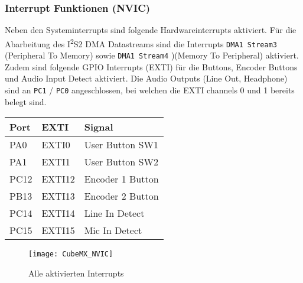 \subsubsection{Interrupt Funktionen (NVIC)}
\label{sec:CubeMXNVIC}

Neben den Systeminterrupts sind folgende Hardwareinterrupts aktiviert.
Für die Abarbeitung des I\textsuperscript{2}S2 DMA Datastreams sind die Interrupts \texttt{DMA1 Stream3} (Peripheral To Memory) sowie \texttt{DMA1 Stream4} )(Memory To Peripheral) aktiviert.
Zudem sind folgende GPIO Interrupts (EXTI) für die Buttons, Encoder Buttons und Audio Input Detect aktiviert. Die Audio Outputs (Line Out, Headphone) sind an \texttt{PC1} / \texttt{PC0} angeschlossen, bei welchen die EXTI channels 0 und 1 bereits belegt sind.

\begin{table}[H]
	\centering
	\begin{tabular}{|l|l|l|}
		\hline
		\textbf{Port} & \textbf{EXTI} & \textbf{Signal}  \\ \hline
		PA0           & EXTI0         & User Button SW1  \\ \hline
		PA1           & EXTI1         & User Button SW2  \\ \hline
		PC12          & EXTI12        & Encoder 1 Button \\ \hline
		PB13          & EXTI13        & Encoder 2 Button \\ \hline
		PC14          & EXTI14        & Line In Detect   \\ \hline
		PC15          & EXTI15        & Mic In Detect    \\ \hline
	\end{tabular}
\end{table}

\begin{figure}[H]
	\centering
	\texttt{[image: CubeMX\_NVIC]}
	\caption{Alle aktivierten Interrupts }
	\label{pic:CubeMX_NVIC}
\end{figure}


